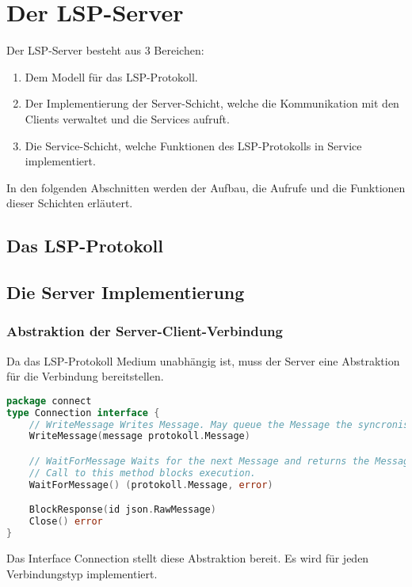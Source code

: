 \documentclass[./einleitung.tex]{subfiles}
\begin{document}
    \section{Der LSP-Server}\label{sec:der-lsp-server}
    Der LSP-Server besteht aus 3 Bereichen:
    \begin{enumerate}
        \item Dem Modell für das LSP-Protokoll.
        \item Der Implementierung der Server-Schicht, welche die Kommunikation mit den Clients verwaltet und die Services aufruft.
        \item Die Service-Schicht, welche Funktionen des LSP-Protokolls in Service implementiert.
    \end{enumerate}

    In den folgenden Abschnitten werden der Aufbau, die Aufrufe und die Funktionen dieser Schichten erläutert.
    \subsection{Das LSP-Protokoll}

    \subsection{Die Server Implementierung}

    \subsubsection{Abstraktion der Server-Client-Verbindung}
    Da das LSP-Protokoll Medium unabhängig ist, muss der Server eine Abstraktion für die Verbindung bereitstellen.
    \begin{lstlisting}[language=Go]
package connect
type Connection interface {
	// WriteMessage Writes Message. May queue the Message the syncronise the Writing
	WriteMessage(message protokoll.Message)

	// WaitForMessage Waits for the next Message and returns the Message or the error.
	// Call to this method blocks execution.
	WaitForMessage() (protokoll.Message, error)

	BlockResponse(id json.RawMessage)
	Close() error
}
    \end{lstlisting}
    Das Interface Connection stellt diese Abstraktion bereit.
    Es wird für jeden Verbindungstyp implementiert.
\end{document}

